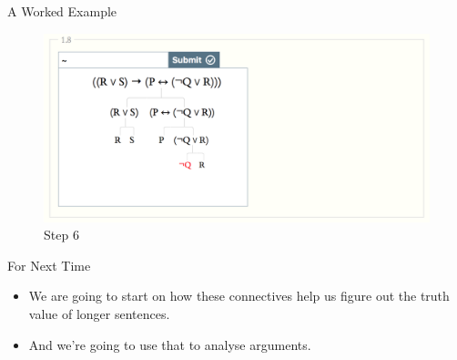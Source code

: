 \documentclass[
  ignorenonframetext,
]{beamer}
\providecommand{\tightlist}{%
  \setlength{\itemsep}{0pt}\setlength{\parskip}{0pt}}
\renewcommand{\,}{\text{, }}
\begin{document}
\begin{frame}{A Worked Example}
\protect\hypertarget{a-worked-example-5}{}
\begin{figure}
\centering
\includegraphics{../images/class2_3/6.png}
\caption{Step 6}
\end{figure}
\end{frame}

\begin{frame}{For Next Time}
\protect\hypertarget{for-next-time}{}
\begin{itemize}
\tightlist
\item
  We are going to start on how these connectives help us figure out the
  truth value of longer sentences.
\item
  And we're going to use that to analyse arguments.
\end{itemize}
\end{frame}
\end{document}
